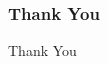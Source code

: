 \begin{frame}
    \frametitle{Thank You}

    \begin{center}
        \Huge{Thank You}
    \end{center}

\end{frame}